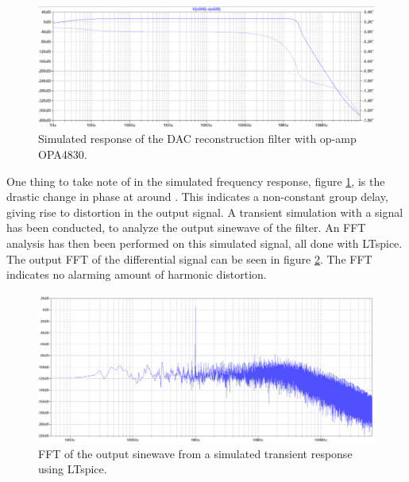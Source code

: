 \begin{figure}[H]
    \centering
    \includegraphics[clip, trim=0 0 0 0, width=1\textwidth]{Sections/7_SystemDesign/Figures/7_1_1_DAC_SIM_FILTER.pdf}
    \caption{Simulated response of the DAC reconstruction filter with op-amp OPA4830.}
    \label{fig_7_1_1_DAC_SIM_RESPONSE}
\end{figure}

One thing to take note of in the simulated frequency response, figure \ref{fig_7_1_1_DAC_SIM_RESPONSE}, is the drastic change in phase at around . This indicates a non-constant group delay, giving rise to distortion in the output signal. A transient simulation with a  signal has been conducted, to analyze the output sinewave of the filter. An FFT analysis has then been performed on this simulated signal, all done with LTspice. The output FFT of the differential signal can be seen in figure \ref{fig_7_1_1_DAC_SIM_FFT}. The FFT indicates no alarming amount of harmonic distortion.

\begin{figure}[H]
    \centering
    \includegraphics[clip, trim=0 0 0 0, width=1\textwidth]{Sections/7_SystemDesign/Figures/7_1_1_DAC_SIM_FFT.pdf}
    \caption{FFT of the output  sinewave from a simulated transient response using LTspice.}
    \label{fig_7_1_1_DAC_SIM_FFT}
\end{figure}